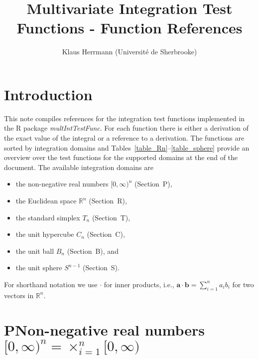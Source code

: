 \documentclass[11pt]{article}
\def\R{\mathbb{R}}
\def\ba{\mathbf{a}}
\def\bb{\mathbf{b}}
\begin{document}
\newpage
\title{\textbf{Mult}ivariate \textbf{Int}egration \textbf{Test Func}tions - Function References}
\author{Klaus Herrmann (Université de Sherbrooke)}
\maketitle

\tableofcontents

\section*{Introduction}
This note compiles references for the integration test functions implemented in the R package \emph{multIntTestFunc}.
For each function there is either a derivation of the exact value of the integral or a reference to a derivation.
The functions are sorted by integration domains and Tables~\ref{table_Rn}--\ref{table_sphere} provide an overview over the test functions for the supported domains at the end of the document.
The available integration domains are
\begin{itemize}
	\item the non-negative real numbers $[0,\infty)^n$ (Section~P),
	\item the Euclidean space $\R^n$ (Section~R),
	\item the standard simplex $T_n$ (Section~T),
	\item the unit hypercube $C_n$ (Section~C),
	\item the unit ball $B_n$ (Section~B), and
	\item the unit sphere $S^{n-1}$ (Section~S).
\end{itemize}
For shorthand notation we use $\cdot$ for inner products, i.e., $\ba\cdot\bb = \sum_{i=1}^n a_ib_i$ for two vectors in $\R^n$.
%
%
%
%
%
%
\section*{P\hspace{0.5cm}Non-negative real numbers $[0,\infty)^n = \times_{i=1}^{n} [0,\infty)$}
\addcontentsline{toc}{section}{P\hspace{0.5cm}Non-negative real numbers $[0,\infty)^n = \times_{i=1}^{n} [0,\infty)$}
\end{document}
